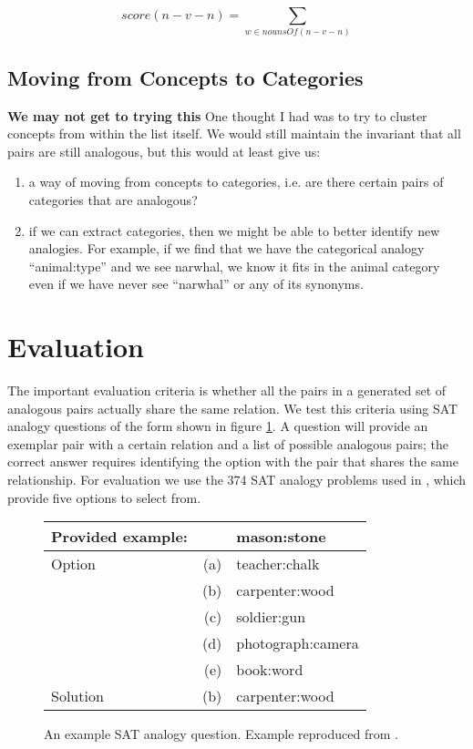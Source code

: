 \documentclass[11pt]{article}
\begin{document}
\[ score(n-v-n) = \sum_{w \in nounsOf(n-v-n)} \]
\subsection{Moving from Concepts to Categories}

{\bf We may not get to trying this} One thought I had was to try to cluster
concepts from within the list itself.  We would still maintain the invariant
that all pairs are still analogous, but this would at least give us:
\begin{enumerate}
  \item a way of moving from concepts to categories, i.e. are there certain
    pairs of categories that are analogous?
  \item if we can extract categories, then we might be able to better identify
    new analogies.  For example, if we find that we have the categorical analogy
    ``animal:type'' and we see narwhal, we know it fits in the animal category
    even if we have never see ``narwhal'' or any of its synonyms.
\end{enumerate}

\section{Evaluation}

The important evaluation criteria is whether all the pairs in a generated set of
analogous pairs actually share the same relation.  We test this criteria using
SAT analogy questions of the form shown in figure \ref{fig:sat-question}.  A
question will provide an exemplar pair with a certain relation and a list of
possible analogous pairs; the correct answer requires identifying the option
with the pair that shares the same relationship.  For evaluation we use the 374
SAT analogy problems used in \cite{turney03combining}, which provide five
options to select from.  

\begin{figure}
  \begin{tabular}{lrl}
    \hline
    Provided example: & & mason:stone \\
    \hline
    Option & (a) & teacher:chalk \\
    & (b) & carpenter:wood  \\
    & (c) & soldier:gun \\
    & (d) & photograph:camera \\
    & (e) & book:word \\
    Solution & (b) & carpenter:wood  \\
    \hline
  \end{tabular}
  \caption{An example SAT analogy question.  Example reproduced from
    \cite{turney03combining}.}
  \label{fig:sat-question}
\end{figure}
\end{document}
